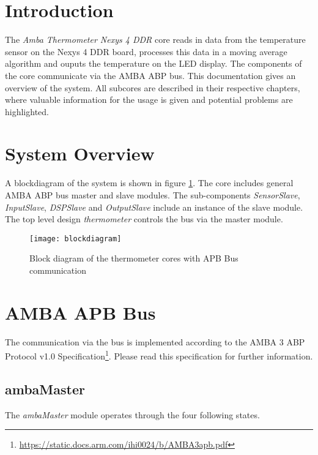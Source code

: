 \documentclass[%
	a4paper,
]
{article}
\begin{document}
\section{Introduction}


The \textit{Amba Thermometer Nexys 4 DDR} core reads in data from the temperature sensor on the Nexys 4 DDR board, processes this data in a moving average algorithm and ouputs the temperature on the LED display. The components of the core communicate via the AMBA ABP bus.
\newline
This documentation gives an overview of the system. All subcores are described in their respective chapters, where valuable information for the usage is given and potential problems are highlighted.


\section{System Overview}

A blockdiagram of the system is shown in figure \ref{fig:block}. The core includes general AMBA ABP bus master and slave modules. The sub-components \textit{SensorSlave}, \textit{InputSlave}, \textit{DSPSlave} and \textit{OutputSlave} include an instance of the slave module. The top level design \textit{thermometer} controls the bus via the master module. 
\newline
\newline
\begin{figure}[h!]
	\centering
	\texttt{[image: blockdiagram]}
	\caption{Block diagram of the thermometer cores with APB Bus communication}
	\label{fig:block}
\end{figure}

\section{AMBA APB Bus}
The communication via the bus is implemented according to the AMBA 3 ABP Protocol v1.0 Specification\footnote{\url{https://static.docs.arm.com/ihi0024/b/AMBA3apb.pdf}}. Please read this specification for further information.

\subsection{ambaMaster}

The \textit{ambaMaster} module operates through the four following states.
\end{document}
